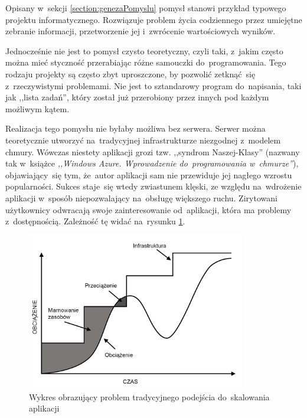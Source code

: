 \documentclass[12pt,a4paper,twoside,titlepage,openright]{book}
\begin{document}
Opisany w~sekcji \ref{section:genezaPomyslu} pomysł stanowi przykład typowego projektu informatycznego. Rozwiązuje problem życia codziennego przez umiejętne zebranie informacji, przetworzenie jej i~zwrócenie wartościowych wyników. 

Jednocześnie nie jest to pomysł czysto teoretyczny, czyli taki, z~jakim często można mieć styczność przerabiając różne samouczki do~programowania. Tego rodzaju projekty są często zbyt uproszczone, by pozwolić zetknąć~się z~rzeczywistymi problemami. Nie jest to sztandarowy program do~napisania, taki jak ,,lista zadań'', który został już przerobiony przez innych pod każdym możliwym kątem.

Realizacja tego pomysłu nie byłaby możliwa bez serwera. Serwer można teoretycznie utworzyć na~tradycyjnej infrastrukturze niezgodnej z~modelem chmury. Wówczas niestety aplikacji grozi tzw. ,,syndrom Naszej-Klasy'' (nazwany tak w~książce \textit{,,Windows Azure. Wprowadzenie do~programowania w~chmurze''}), objawiający~się tym, że~autor aplikacji sam nie przewiduje jej nagłego wzrostu popularności. Sukces staje~się wtedy zwiastunem klęski, ze względu na~wdrożenie aplikacji w~sposób niepozwalający na~obsługę większego ruchu. Zirytowani użytkownicy odwracają swoje zainteresowanie od~aplikacji, która ma problemy z~dostępnością. \cite{windowsAzureWprowadzenie} Zależność tę widać na~rysunku \ref{fig:nasza-klasa}.

\begin{figure}[h]
	\centering
			\includegraphics[width=0.85\textwidth]{nasza-klasa.png}
		\caption{Wykres obrazujący problem tradycyjnego podejścia do~skalowania aplikacji \cite{windowsAzureWprowadzenie}}
		\label{fig:nasza-klasa}
\end{figure}
\end{document}
